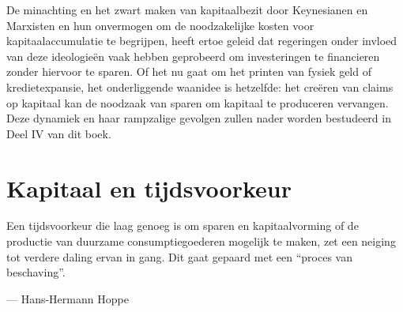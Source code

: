 De minachting en het zwart maken van kapitaalbezit door Keynesianen en Marxisten en hun onvermogen om de noodzakelijke kosten voor kapitaalaccumulatie te begrijpen, heeft ertoe geleid dat regeringen onder invloed van deze ideologieën vaak hebben geprobeerd om investeringen te financieren zonder hiervoor te sparen. Of het nu gaat om het printen van fysiek geld of kredietexpansie, het onderliggende waanidee is hetzelfde: het creëren van claims op kapitaal kan de noodzaak van sparen om kapitaal te produceren vervangen. Deze dynamiek en haar rampzalige gevolgen zullen nader worden bestudeerd in Deel IV van dit boek.

\hypertarget{kapitaal-en-tijdsvoorkeur}{%
\section{Kapitaal en tijdsvoorkeur}\label{kapitaal-en-tijdsvoorkeur}}

\begin{blockquotebox}
    Een tijdsvoorkeur die laag genoeg is om sparen en kapitaalvorming of de productie van duurzame consumptiegoederen mogelijk te maken, zet een neiging tot verdere daling ervan in gang. Dit gaat gepaard met een ``proces van beschaving''.\footnotemark
    \par\raggedleft--- Hans-Hermann Hoppe
\end{blockquotebox}
\autocite{66}

